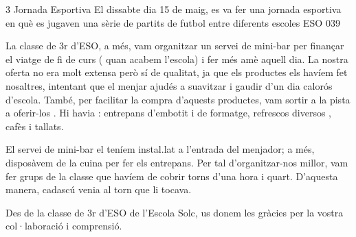 \begin{news}
{3} %
{Jornada Esportiva}
{El dissabte dia 15 de maig,  es va fer una jornada esportiva en què es jugaven una sèrie de partits de futbol entre diferents escoles}
{ESO}
{039} %


La classe de 3r d’ESO, a més, vam organitzar un servei de mini-bar per finançar el viatge de fi de curs  ( quan acabem l'escola) i fer més amè aquell dia. La nostra oferta no era molt extensa però sí de qualitat, ja que els productes els havíem fet nosaltres, intentant que el menjar ajudés a suavitzar i gaudir d’un dia calorós d’escola. També, per facilitar la compra d’aquests productes, vam sortir a la pista a oferir-los . Hi havia : entrepans d'embotit i de formatge, refrescos diversos , cafès i tallats.

El servei de mini-bar el teníem instal.lat a l’entrada del menjador; a més, disposàvem de la cuina per fer els entrepans. Per tal d’organitzar-nos millor, vam fer grups de la classe que havíem de cobrir torns d’una hora i quart. D’aquesta manera, cadascú venia al torn que li tocava.

Des de la classe de 3r d’ESO de l’Escola Solc, us donem les gràcies per la vostra col·laboració i comprensió. 



\end{news}
